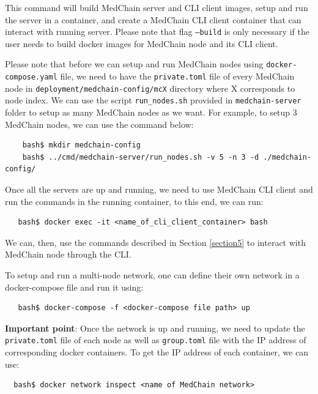 This command will build MedChain server and CLI client images, setup and run the server in a container, and create a MedChain CLI client container that can interact with running server. Please note that flag \texttt{--build} is only necessary if the user needs to build docker images for MedChain node and its CLI client. 

Please note that before we can setup and run MedChain nodes using \texttt{docker-compose.yaml} file, we need to have the \texttt{private.toml} file of every MedChain node in \texttt{deployment/medchain-config/mcX} directory where X corresponds to node index. We can use the script \texttt{run\_nodes.sh} provided in \texttt{medchain-server} folder to setup as many MedChain nodes as we want. For example, to setup 3  MedChain nodes, we can use the command below:

\begin{verbatim}
    bash$ mkdir medchain-config
    bash$ ../cmd/medchain-server/run_nodes.sh -v 5 -n 3 -d ./medchain-config/
\end{verbatim}

Once all the servers are up and running, we need to use MedChain CLI client and run the commands in the running container, to this end, we can run:

\begin{verbatim}
   bash$ docker exec -it <name_of_cli_client_container> bash
\end{verbatim}

We can, then, use the commands described in Section \ref{section5} to interact with MedChain node through the CLI.  

To setup and run a multi-node network, one can define their own network in a docker-compose file and run it using:

\begin{verbatim}
   bash$ docker-compose -f <docker-compose file path> up  
\end{verbatim}


\textbf{Important point}: Once the network is up and running, we need to update the \texttt{private.toml} file of each node as well as \texttt{group.toml} file with the IP address of corresponding docker containers. To get the IP address of each container, we can use:

\begin{verbatim}
  bash$ docker network inspect <name of MedChain network>
\end{verbatim}
